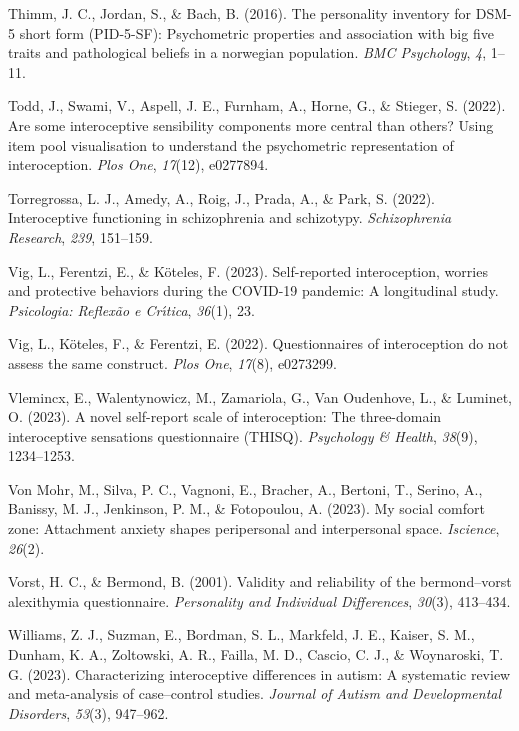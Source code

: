 \documentclass[
  jou,
  floatsintext,
  longtable,
  nolmodern,
  notxfonts,
  notimes,
  colorlinks=true,linkcolor=blue,citecolor=blue,urlcolor=blue]{apa7}
\newlength{\cslhangindent}
\newenvironment{CSLReferences}[2] %
 {\begin{list}{}{%
  \setlength{\itemindent}{0pt}
  \setlength{\leftmargin}{0pt}
  \setlength{\parsep}{0pt}
  \ifodd #1
   \setlength{\leftmargin}{\cslhangindent}
   \setlength{\itemindent}{-1\cslhangindent}
  \fi
  \setlength{\itemsep}{#2\baselineskip}}}
 {\end{list}}
\begin{document}
\begin{CSLReferences}{1}{0}
Thimm, J. C., Jordan, S., \& Bach, B. (2016). The personality inventory
for DSM-5 short form (PID-5-SF): Psychometric properties and association
with big five traits and pathological beliefs in a norwegian population.
\emph{BMC Psychology}, \emph{4}, 1--11.

Todd, J., Swami, V., Aspell, J. E., Furnham, A., Horne, G., \& Stieger,
S. (2022). Are some interoceptive sensibility components more central
than others? Using item pool visualisation to understand the
psychometric representation of interoception. \emph{Plos One},
\emph{17}(12), e0277894.

Torregrossa, L. J., Amedy, A., Roig, J., Prada, A., \& Park, S. (2022).
Interoceptive functioning in schizophrenia and schizotypy.
\emph{Schizophrenia Research}, \emph{239}, 151--159.

Vig, L., Ferentzi, E., \& Köteles, F. (2023). Self-reported
interoception, worries and protective behaviors during the COVID-19
pandemic: A longitudinal study. \emph{Psicologia: Reflex{ã}o e
Cr{ı́}tica}, \emph{36}(1), 23.

Vig, L., Köteles, F., \& Ferentzi, E. (2022). Questionnaires of
interoception do not assess the same construct. \emph{Plos One},
\emph{17}(8), e0273299.

Vlemincx, E., Walentynowicz, M., Zamariola, G., Van Oudenhove, L., \&
Luminet, O. (2023). A novel self-report scale of interoception: The
three-domain interoceptive sensations questionnaire (THISQ).
\emph{Psychology \& Health}, \emph{38}(9), 1234--1253.

Von Mohr, M., Silva, P. C., Vagnoni, E., Bracher, A., Bertoni, T.,
Serino, A., Banissy, M. J., Jenkinson, P. M., \& Fotopoulou, A. (2023).
My social comfort zone: Attachment anxiety shapes peripersonal and
interpersonal space. \emph{Iscience}, \emph{26}(2).

Vorst, H. C., \& Bermond, B. (2001). Validity and reliability of the
bermond--vorst alexithymia questionnaire. \emph{Personality and
Individual Differences}, \emph{30}(3), 413--434.

Williams, Z. J., Suzman, E., Bordman, S. L., Markfeld, J. E., Kaiser, S.
M., Dunham, K. A., Zoltowski, A. R., Failla, M. D., Cascio, C. J., \&
Woynaroski, T. G. (2023). Characterizing interoceptive differences in
autism: A systematic review and meta-analysis of case--control studies.
\emph{Journal of Autism and Developmental Disorders}, \emph{53}(3),
947--962.


\end{CSLReferences}
\end{document}
